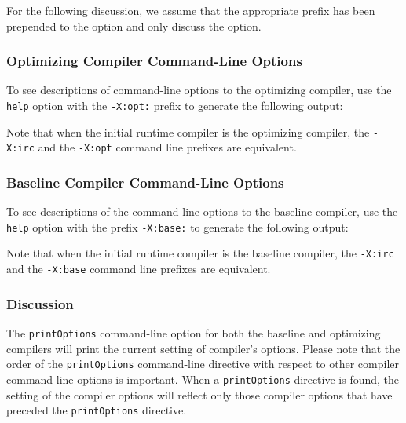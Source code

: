 For the following discussion, we assume that the appropriate prefix
has been prepended to the option and only discuss the option.

\subsubsection{Optimizing Compiler Command-Line Options}
\label{section:nonadaptive:optimizing:options}

To see descriptions of command-line options to the optimizing compiler,
use the {\tt help} option with the {\tt -X:opt:} prefix 
to generate the following output:

\T \begin{tiny}

\T \end{tiny}

Note that when the initial runtime compiler is the optimizing compiler, 
the {\tt -X:irc} and the {\tt -X:opt} command line prefixes are equivalent.

\subsubsection{Baseline Compiler Command-Line Options}
\label{section:nonadaptive:baseline:options}

To see descriptions of the command-line options to the baseline
compiler, use the {\tt help} option with the prefix {\tt -X:base:} 
to generate the following output:

\T \begin{small}

\T \end{small}
 
Note that when the initial runtime compiler is the baseline compiler, 
the {\tt -X:irc} and the {\tt -X:base} command line prefixes are equivalent.

\subsubsection{Discussion}

The {\tt printOptions} command-line option for both the baseline and 
optimizing compilers will print the current setting of compiler's options.  
Please note that the order of the {\tt printOptions} command-line directive 
with respect to other compiler command-line options is important.  
When a {\tt printOptions} directive is found, the setting of the  
compiler options will reflect only those compiler options
that have preceded the {\tt printOptions} directive.  


